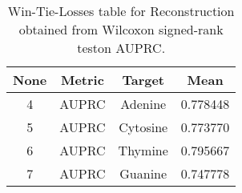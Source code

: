 \begin{table}[H]
\centering
\begin{tabular}{|c|c|c|c|}

 \textbf{None} & \textbf{Metric} & \textbf{Target} &  \textbf{Mean} \\
\hline

             4 &           AUPRC &         Adenine &       0.778448 \\
\hline
             5 &           AUPRC &        Cytosine &       0.773770 \\
\hline
             6 &           AUPRC &         Thymine &       0.795667 \\
\hline
             7 &           AUPRC &         Guanine &       0.747778 \\
\hline

\end{tabular}
\caption{Win-Tie-Losses table for Reconstruction obtained from Wilcoxon signed-rank teston AUPRC.}
\label{tab:reconstruction_nucleotides_means}
\end{table}
